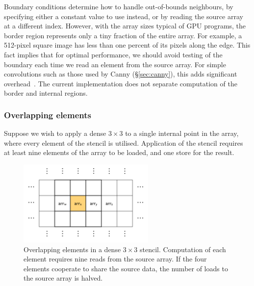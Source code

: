 Boundary conditions determine how to handle out-of-bounds neighbours, by
specifying either a constant value to use instead, or by reading the source
array at a different index. However, with the array sizes typical of
GPU\gpu{} programs, the border region represents only a tiny fraction of the
entire array. For example, a 512-pixel square image has less than one percent of
its pixels along the edge. This fact implies that for optimal performance, we
should avoid testing of the boundary each time we read an element from the
source array. For simple convolutions such as those used by
Canny (\S\ref{sec:canny}), this adds significant
overhead~\cite{Lippmeier:2011cd}.
%
The current implementation does not separate computation of the border and
internal regions.


\subsubsection{Overlapping elements}

Suppose we wish to apply a dense $3\times3$  to a single
internal point in the array, where every element of the stencil is utilised.
Application of the stencil requires at least nine elements of the array to be
loaded, and one store for the result.

\begin{figure}[tbp]
    \begin{center}
        \includegraphics[width=0.6\textwidth]{images/basics/stencil-sharing}
    \end{center}
    \caption[Overlapping elements in a $3\times3$ stencil]{
        Overlapping elements in a dense $3\times3$ stencil. Computation of each
        element requires nine reads from the source array. If the four elements
        cooperate to share the source data, the number of loads to the source
        array is halved.}
    \label{fig:stencil_sharing}
\end{figure}

